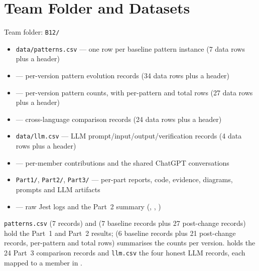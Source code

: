 \documentclass[11pt,a4paper]{article}
\begin{document}
\section{Team Folder and Datasets}
\begin{sloppypar}
Team folder: \texttt{B12/}
\begin{itemize}
  \item \texttt{data/patterns.csv} --- one row per baseline pattern instance
        (7 data rows plus a header)
  \item {} --- per-version pattern evolution
        records (34 data rows plus a header)
  \item {} --- per-version pattern counts, with
        per-pattern and total rows (27 data rows plus a header)
  \item {} --- cross-language comparison records
        (24 data rows plus a header)
  \item \texttt{data/llm.csv} --- LLM prompt/input/output/verification records
        (4 data rows plus a header)
  \item {} --- per-member contributions and the shared
        ChatGPT conversations
  \item \texttt{Part1/}, \texttt{Part2/}, \texttt{Part3/} --- per-part reports,
        code, evidence, diagrams, prompts and LLM artifacts
  \item {} --- raw Jest logs and the Part~2 summary
        (, ,
        )
\end{itemize}

\noindent\texttt{patterns.csv} (7 records) and 
(7 baseline records plus 27 post-change records) hold the Part~1 and Part~2
results;  (6 baseline records plus 21 post-change
records, per-pattern and total rows) summarises the counts per version.
 holds the 24 Part~3 comparison records and
\texttt{llm.csv} the four honest LLM records, each mapped to a member in
.
\end{sloppypar}
\end{document}
